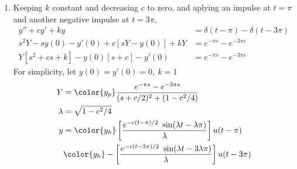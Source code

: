\begin{enumerate}
\begin{enumerate}
\begin{figure}[H]
                    \end{figure}

              \item Keeping $ k $ constant and decreasing $ c $ to zero, and aplying an
                    impulse at $ t = \pi $ and another negative impulse at $ t = 3\pi $,
                    \begin{align}
                        y'' + cy' + ky                           &
                        = \delta(t - \pi) - \delta(t - 3\pi)       \\
                        s^2Y - sy(0) - y'(0) + c[sY - y(0)] + kY &
                        = e^{-\pi s} - e^{-3\pi s}                 \\
                        Y[s^2 + cs + k] - y(0)[s + c] - y'(0)    &
                        = e^{-\pi s} - e^{-3\pi s}
                    \end{align}
                    For simplicity, let $ y(0) = y'(0) = 0,\ k = 1 $
                    \begin{align}
                        Y       & = \color{y_p}
                        \frac{e^{-\pi s} - e^{-3\pi s}} {(s+c/2)^2 + (1 - c^2/4)} \\
                        \lambda & = \sqrt{1 - c^2/4}                              \\
                        y       & = \color{y_h}
                        \left[ \frac{e^{-c(t - \pi)/2}\ \sin(\lambda t - \lambda \pi)}
                        {\lambda} \right] u(t - \pi)                              \\
                                & \color{y_h} - \left[ \frac{e^{-c(t - 3\pi)/2}\
                                \sin(\lambda t - 3\lambda \pi)}{\lambda} \right]
                        u(t - 3\pi)
                    \end{align}

\end{enumerate}
\end{enumerate}
